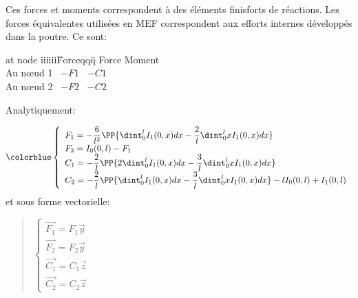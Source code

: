 Ces forces et moments correspondent à des éléments finisforts de réactions.
Les forces équivalentes utilisées en MEF correspondent aux efforts internes
développés dans la poutre. Ce sont:

\begin{tabbing}
  at node iiiiii\=Forceqqq\= \kill
       \>Force \>Moment\\
  Au nœud 1 \> ~$-F1$ \> ~$-C1$\\
  Au nœud 2 \> ~$-F2$ \> ~$-C2$\\
\end{tabbing}

Analytiquement:

\begin{equation}\colorblue
\label{Feq}\left\{
\begin{array}{l}
  F_1=-\dfrac 6{l^2}\PP{\dint_0^lI_1(0,x)dx-\dfrac 2l\dint_0^lxI_1(0,x)dx} \\
  F_2=I_0(0,l)-F_1 \\
  C_1=-\dfrac 2l\PP{2\dint_0^lI_1(0,x)dx-\dfrac3l\dint_0^lxI_1(0,x)dx} \\
  C_2=-\dfrac 2l\PP{\dint_0^lI_1(0,x)dx-\dfrac3l\dint_0^lxI_1(0,x)dx}
  -lI_0(0,l)+I_1(0,l)
\end{array}
\right.
\end{equation}
et sous forme vectorielle:

\begin{quotation}
$\left\{
\begin{array}{l}
  \overrightarrow{F_1}=F_1\overrightarrow{y} \\
  \overrightarrow{F_2}=F_2\overrightarrow{y} \\
  \overrightarrow{C_1}=C_1\overrightarrow{z} \\
  \overrightarrow{C_2}=C_2\overrightarrow{z}
\end{array}
\right.~$
\end{quotation}


